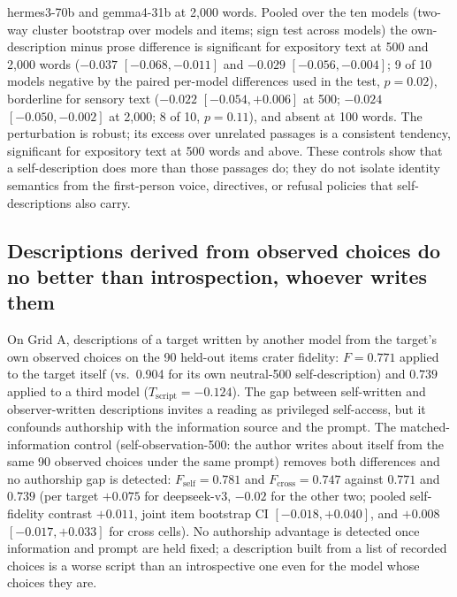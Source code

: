 \documentclass[11pt]{article}
\newcommand{\Fself}{F_{\mathrm{self}}}
\newcommand{\Fcross}{F_{\mathrm{cross}}}
\newcommand{\Tscript}{T_{\mathrm{script}}}
\begin{document}
hermes3-70b and gemma4-31b at 2{,}000 words. Pooled over the ten models
(two-way cluster bootstrap over models and items; sign test across models)
the own-description minus prose difference is significant for expository
text at 500 and 2{,}000 words ($-0.037$ $[-0.068, -0.011]$ and $-0.029$
$[-0.056, -0.004]$; 9 of 10 models negative by the paired per-model
differences used in the test, $p=0.02$), borderline for sensory text
($-0.022$ $[-0.054, +0.006]$ at 500; $-0.024$ $[-0.050, -0.002]$ at
2{,}000; 8 of 10, $p=0.11$), and absent at 100 words. The perturbation is
robust; its excess over unrelated passages is a consistent tendency,
significant for expository text at 500 words and above. These controls show
that a self-description does more than those passages do; they do not
isolate identity semantics from the first-person voice, directives, or
refusal policies that self-descriptions also carry.

\subsection{Descriptions derived from observed choices do no better than introspection, whoever writes them}
\label{sec:thirdperson}
On Grid A, descriptions of a target written by another model from the target's own
observed choices on the 90 held-out items crater fidelity: $F=0.771$ applied
to the target itself (vs.\ 0.904 for its own neutral-500 self-description)
and $0.739$ applied to a third model ($\Tscript=-0.124$). The gap between
self-written and observer-written descriptions invites a reading as
privileged self-access, but it confounds authorship with the information
source and the prompt. The matched-information control
(self-observation-500: the author writes about itself from the same 90
observed choices under the same prompt) removes both differences and no
authorship gap is detected: $\Fself = 0.781$ and $\Fcross = 0.747$ against $0.771$ and
$0.739$ (per target $+0.075$ for deepseek-v3, $-0.02$ for the other two;
pooled self-fidelity contrast $+0.011$, joint item bootstrap CI
$[-0.018, +0.040]$, and $+0.008$ $[-0.017, +0.033]$ for cross cells).
No authorship advantage is detected once information and prompt are held
fixed; a
description built from a list of recorded choices is a worse script than an
introspective one even for the model whose choices they are.
\end{document}

